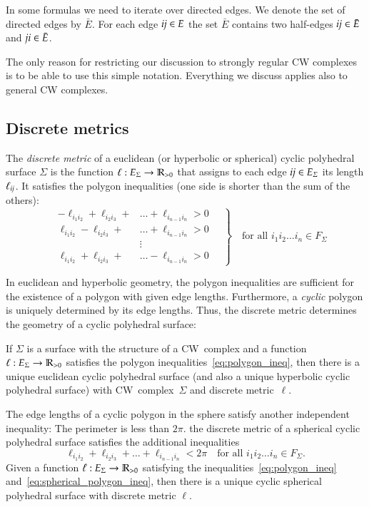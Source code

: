 \documentclass[Thesis]{subfiles}
\begin{document}
In some formulas we need to iterate over directed edges. We denote the set 
of directed edges by $\bar E$. For each edge $\it ij\in E$ the set $\bar E$
contains two half-edges $\it ij\in \bar E$ and $\it ji \in \bar E$.

The only reason for restricting our discussion to strongly regular CW
complexes is to be able to use this simple notation. Everything we
discuss applies also to general CW complexes.

\subsection{Discrete metrics}
\label{sec:discrete-metrics}

The \emph{discrete metric} of a euclidean (or hyperbolic or
spherical) cyclic polyhedral surface $\Sigma$ is the function
$\ell:E_{\Sigma}\rightarrow\mathbb R_{>0}$ that assigns to each edge $\it ij \in E_{\Sigma}$ its
length $\ell_{\it ij}$. It satisfies the polygon inequalities (one side is
shorter than the sum of the others):
\begin{equation}
\label{eq:polygon_ineq}
\left.
\quad
\begin{aligned}
-\ell_{i_{1}i_{2}}+\ell_{i_{2}i_{3}}+&\ldots+\ell_{i_{n-1}i_{n}}
>0\\
\ell_{i_{1}i_{2}}-\ell_{i_{2}i_{3}}+&\ldots+\ell_{i_{n-1}i_{n}}
>0\\
&\vdots\\
\ell_{i_{1}i_{2}}+\ell_{i_{2}i_{3}}+&\ldots-\ell_{i_{n-1}i_{n}}
>0
\end{aligned}
\quad
\right\}
\quad
\text{for all $i_{1}i_{2}\ldots i_{n}\in F_{\Sigma}$}
\end{equation}

In euclidean and hyperbolic geometry, the polygon inequalities are
sufficient for the existence of a polygon with given edge
lengths. Furthermore, a \emph{cyclic} polygon is uniquely determined
by its edge lengths. Thus, the discrete metric determines the geometry
of a cyclic polyhedral surface:

If $\Sigma$ is a surface with the structure of a CW~complex and a
function $\ell:E_{\Sigma}\rightarrow\mathbb R_{>0}$ satisfies the polygon
inequalities~\eqref{eq:polygon_ineq}, then there is a unique euclidean
cyclic polyhedral surface (and also a unique hyperbolic cyclic
polyhedral surface) with CW~complex~$\Sigma$ and discrete
metric~$\ell$.

The edge lengths of a cyclic polygon in the sphere satisfy another
independent inequality: The perimeter is less than $2\pi$.  the discrete metric of a
spherical cyclic polyhedral surface satisfies the additional
inequalities
\begin{equation}
\label{eq:spherical_polygon_ineq}
\ell_{i_{1}i_{2}}+\ell_{i_{2}i_{3}}+\ldots+\ell_{i_{n-1}i_{n}}
<2\pi
\quad
\text{for all $i_{1}i_{2}\ldots i_{n}\in F_{\Sigma}$.}
\end{equation}
Given a function $\ell:E_{\Sigma}\rightarrow\mathbb R_{>0}$ satisfying the
inequalities~\eqref{eq:polygon_ineq}
and~\eqref{eq:spherical_polygon_ineq}, then there is a unique cyclic
spherical polyhedral surface with discrete metric $\ell$.
\end{document}
